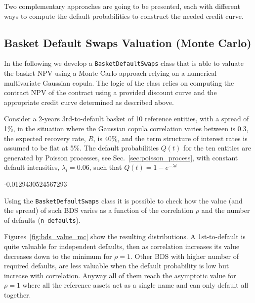 Two complementary approaches are going to be presented, each with different ways to compute the default probabilities to construct the needed credit curve.

\subsection{Basket Default Swaps Valuation (Monte Carlo)}
\label{basket-cds-valuation-with-monte-carlo}

\begin{finmarkets}
In the following we develop a \texttt{BasketDefaultSwaps} class that is able to valuate the basket NPV using a Monte Carlo approach relying on a numerical multivariate Gaussian copula. 
The logic of the class relies on computing the contract NPV of the contract using a provided discount curve and the appropriate credit curve determined as described above.
\end{finmarkets}


Consider a 2-years 3rd-to-default basket of 10 reference entities, with a spread of 1\%, in the situation where the Gaussian copula correlation varies between is 0.3, the expected recovery rate, $R$, is $40\%$, and the term structure of interest rates is assumed to be flat at 5\%. The default probabilities $Q(t)$ for the ten entities are generated by Poisson processes, see Sec.~\ref{sec:poisson_process}, with constant default intensities, $\lambda_i=0.06$, such that $Q(t) = 1 - e^{-\lambda t}$

\begin{ioutput}
-0.0129430524567293
\end{ioutput}

Using the \texttt{BasketDefaultSwaps} class it is possible to check how the value (and the spread) of such BDS varies as a function of the correlation $\rho$ and the number of defaults (\texttt{n\_defaults}).

Figures~\ref{fig:bds_value_mc} show the resulting distributions. A 1st-to-default is quite valuable for independent defaults, then as correlation increases its value decreases down to the minimum for $\rho=1$.
Other BDS with higher number of required defaults, are less valuable when the default probability is low but increase with correlation. Anyway all of them reach the asymptotic value for $\rho=1$ where all the reference assets act as a single name and can only default all together.

